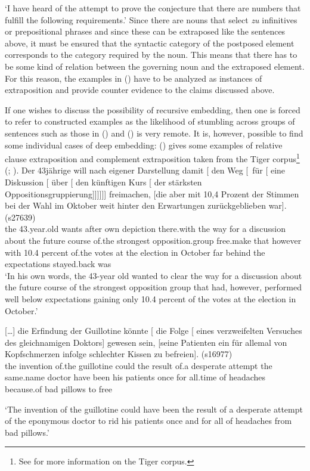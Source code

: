 \glt `I have heard of the attempt to prove the conjecture that there are numbers that fulfill the following requirements.'
\zl
Since there are nouns that select \emph{zu} infinitives or prepositional phrases and since these can
be extraposed like the sentences above, it must be ensured that the syntactic category of the postposed element corresponds to the category required by the noun.
This means that there has to be some kind of relation between the governing noun and the extraposed element. For this reason, the examples in
() have to be analyzed as instances of extraposition and provide counter evidence to the claims discussed above.

If one wishes to discuss the possibility of recursive embedding, then one is forced to refer to constructed examples as the likelihood of stumbling across groups of sentences
such as those in () and () is very remote. It is, however, possible to find some individual cases of deep embedding:
() gives some examples of relative clause extraposition and complement extraposition taken from the Tiger corpus\footnote{%
  See  for more information on the Tiger corpus.
} (\citealp[--79]{Mueller2007c}; \citealp[Section~2.1]{MM2009a}).
\eal
\ex 
\gll Der 43jährige will nach eigener Darstellung damit [ den Weg [~für [ eine
  Diskussion [ über [ den künftigen Kurs [ der stärksten
  Oppositions\-gruppierung]]]]]] freimachen, [die aber mit 10,4 Prozent
  der Stimmen bei der Wahl im Oktober weit hinter den Erwartungen zurückgeblieben war]. (s27639)\\
  the 43.year.old wants after own depiction there.with {} the way \hspaceThis{[\sub{PP}~}for {} a discussion {} about {} the future course {} of.the strongest
  opposition.group free.make \spacebr{}that however with 10.4 percent
  of.the votes at the election in October far behind the expectations stayed.back was\\
\glt `In his own words, the 43-year old wanted to clear the way for a discussion about the future course of the strongest opposition group that had, however, performed well below expectations gaining only 10.4 percent of the votes at the election in October.'
\ex 
{\raggedright
\gll {}[\ldots] die Erfindung der Guillotine könnte [ die Folge [ eines verzweifelten
    Versuches des gleichnamigen Doktors] gewesen sein, [seine Patienten ein für allemal von
    Kopfschmerzen infolge schlechter Kissen zu befreien]. (s16977)\\
    {}  the invention of.the guillotine could {} the result {} of.a desperate attempt the same.name doctor have been \spacebr{}his patients
once for all.time of headaches because.of bad pillows to free\\
\par}
\glt `The invention of the guillotine could have been the result of a desperate attempt of the
eponymous doctor to rid his patients once and for all of headaches from bad pillows.'
\zl

